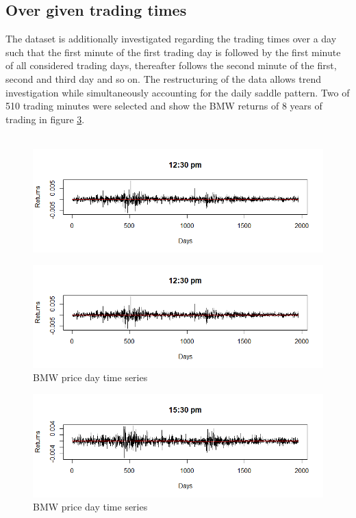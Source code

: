 \documentclass[12pt]{article}
\begin{document}
\subsection{Over given trading times}
\label{tradingtimes}
The dataset is additionally investigated regarding the trading times over a day such that the first minute of the first trading day is followed by the first minute of all considered trading days, thereafter follows the second minute of the first, second and third day and so on. 
The restructuring of the data allows trend investigation while simultaneously accounting for the daily saddle pattern. Two of 510 trading minutes were selected and show the BMW returns of 8 years of trading in figure \ref{figure:5.3}.\\
\\
\begin{figure}[htbp] 
	\centering
	\includegraphics[width=1\textwidth]{Ret_trading_times_03.png}
	\label{figure:5.1}
\end{figure}
\begin{figure}[htbp] 
	\centering
	\includegraphics[width=1\textwidth]{Ret_trading_times_03.png}
	\caption[BMW]{BMW price day time series}
	\label{figure:5.2}
\end{figure}
\begin{figure}[htbp] 
	\centering
	
	\includegraphics[width=1\textwidth]{Ret_trading_times_05.png}
	\caption[BMW]{BMW price day time series}
	\label{figure:5.3}
\end{figure}
\end{document}

